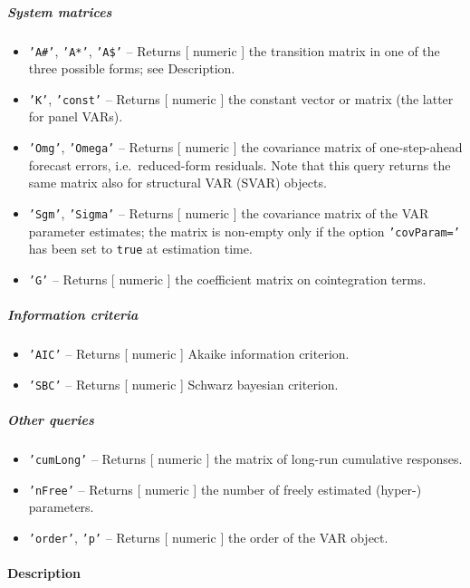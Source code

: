 \subparagraph{System matrices}

\begin{itemize}
\item
  \texttt{'A\#'}, \texttt{'A*'}, \texttt{'A\$'} -- Returns {[} numeric
  {]} the transition matrix in one of the three possible forms; see
  Description.
\item
  \texttt{'K'}, \texttt{'const'} -- Returns {[} numeric {]} the constant
  vector or matrix (the latter for panel VARs).
\item
  \texttt{'Omg'}, \texttt{'Omega'} -- Returns {[} numeric {]} the
  covariance matrix of one-step-ahead forecast errors, i.e.~reduced-form
  residuals. Note that this query returns the same matrix also for
  structural VAR (SVAR) objects.
\item
  \texttt{'Sgm'}, \texttt{'Sigma'} -- Returns {[} numeric {]} the
  covariance matrix of the VAR parameter estimates; the matrix is
  non-empty only if the option \texttt{'covParam='} has been set to
  \texttt{true} at estimation time.
\item
  \texttt{'G'} -- Returns {[} numeric {]} the coefficient matrix on
  cointegration terms.
\end{itemize}

\subparagraph{Information criteria}

\begin{itemize}
\item
  \texttt{'AIC'} -- Returns {[} numeric {]} Akaike information
  criterion.
\item
  \texttt{'SBC'} -- Returns {[} numeric {]} Schwarz bayesian criterion.
\end{itemize}

\subparagraph{Other queries}

\begin{itemize}
\item
  \texttt{'cumLong'} -- Returns {[} numeric {]} the matrix of long-run
  cumulative responses.
\item
  \texttt{'nFree'} -- Returns {[} numeric {]} the number of freely
  estimated (hyper-) parameters.
\item
  \texttt{'order'}, \texttt{'p'} -- Returns {[} numeric {]} the order of
  the VAR object.
\end{itemize}

\paragraph{Description}


